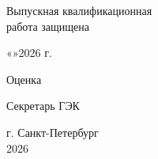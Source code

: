 \begin{titlepage}
\vspace{0.4cm}

\begin{flushright}
\begin{minipage}{0.46\textwidth}
Выпускная квалификационная\\
работа защищена

\vspace{0.15cm}

«\underline{\hspace{0.8cm}}»\underline{\hspace{2.5cm}}2026 г.

\vspace{0.18cm}

Оценка

\vspace{0.12cm}

\underline{\hspace{3.0cm}}

\vspace{0.18cm}

Секретарь ГЭК \underline{\hspace{2.2cm}}
\end{minipage}
\end{flushright}

\vfill

\begin{center}
г. Санкт-Петербург\\
2026
\end{center}
\end{titlepage}
